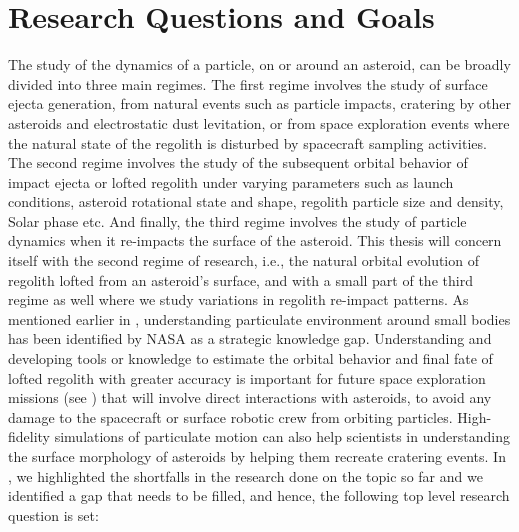 \chapter{Research Questions and Goals}
\label{chap:research_questions}
\graphicspath{{Research_Questions/Images/}}

The study of the dynamics of a particle, on or around an asteroid, can be broadly divided into three main regimes. The first regime involves the study of surface ejecta generation, from natural events such as particle impacts, cratering by other asteroids and electrostatic dust levitation, or from space exploration events where the natural state of the regolith is disturbed by spacecraft sampling activities. The second regime involves the study of the subsequent orbital behavior of impact ejecta or lofted regolith under varying parameters such as launch conditions, asteroid rotational state and shape, regolith particle size and density, Solar phase etc. And finally, the third regime involves the study of particle dynamics when it re-impacts the surface of the asteroid. This thesis will concern itself with the second regime of research, i.e., the natural orbital evolution of regolith lofted from an asteroid’s surface, and with a small part of the third regime as well where we study variations in regolith re-impact patterns.
%
\newline\newline
%
As mentioned earlier in , understanding particulate environment around small bodies has been identified by \gls{NASA} as a strategic knowledge gap. Understanding and developing tools or knowledge to estimate the orbital behavior and final fate of lofted regolith with greater accuracy is important for future space exploration missions (see ) that will involve direct interactions with asteroids, to avoid any damage to the spacecraft or surface robotic crew from orbiting particles. High-fidelity simulations of particulate motion can also help scientists in understanding the surface morphology of asteroids by helping them recreate cratering events. In , we highlighted the shortfalls in the research done on the topic so far and we identified a gap that needs to be filled, and hence, the following top level research question is set:
\vspace{5mm}
\begin{center}
\end{center}

